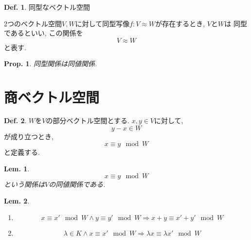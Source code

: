\documentclass[a4paper,10pt,report]{amsart}
\theoremstyle{plain}
\newtheorem{lem}{Lem.}[section]
\newtheorem{prop}{Prop.}[section]
\theoremstyle{definition}
\newtheorem{defn}{Def.}[section]
\theoremstyle{remark}
\begin{document}
\begin{leftbar}
    \begin{defn}同型なベクトル空間\par
        2つのベクトル空間\(V,W\)に対して同型写像\(f:V\approx W\)が存在するとき, \(V\)と\(W\)は
        同型であるといい, この関係を
        \begin{equation}
            V\approx W
        \end{equation}
        と表す. 
    \end{defn}
\end{leftbar}
\begin{leftbar}
    \begin{prop}同型関係は同値関係.
    \end{prop}
\end{leftbar}
\section{商ベクトル空間}
\begin{leftbar}
    \begin{defn}
        \(W\)を\(V\)の部分ベクトル空間とする. \(x,y\in V\)に対して, 
        \begin{equation}
            y-x\in W
        \end{equation}
        が成り立つとき, 
        \begin{equation}
            x\equiv y\mod{W}
        \end{equation}
        と定義する.
    \end{defn}
\end{leftbar}
\begin{leftbar}
    \begin{lem}
        \begin{equation}
            x\equiv y\mod{W}
        \end{equation}
        という関係は\(V\)の同値関係である. 
    \end{lem}
\end{leftbar}
\begin{leftbar}
    \begin{lem}
        \begin{enumerate}
            \item 
            \begin{equation}
                x\equiv x'\mod{W}\wedge y\equiv y'\mod{W}\Rightarrow x+y\equiv x'+y'\mod{W} 
            \end{equation}
            \item 
            \begin{equation}
                \lambda\in K\wedge x\equiv x'\mod{W}\Rightarrow \lambda x\equiv\lambda x'\mod{W}
            \end{equation}
        \end{enumerate}
    \end{lem}
\end{leftbar}
\end{document}
